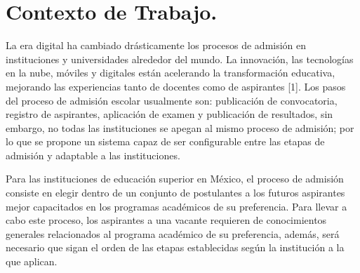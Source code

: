 \section{Contexto de Trabajo.}
    La era digital ha cambiado drásticamente los procesos de admisión en instituciones y universidades alrededor del mundo. La innovación, las  tecnologías en la nube, móviles y digitales están acelerando la transformación educativa, mejorando las experiencias tanto de docentes como de aspirantes [1]. Los pasos del proceso de admisión escolar usualmente son: publicación de convocatoria, registro de aspirantes, aplicación de examen y publicación de resultados, sin embargo, no todas las instituciones se apegan al mismo proceso de admisión; por lo que se propone un sistema capaz de ser configurable entre las etapas de admisión y adaptable a las instituciones.
    
    Para las instituciones de educación superior en México, el proceso de admisión consiste en elegir dentro de un conjunto de postulantes a los futuros aspirantes mejor capacitados en los programas académicos de su preferencia. Para llevar a cabo este proceso, los aspirantes a una vacante requieren de conocimientos generales relacionados al programa académico de su preferencia, además, será necesario que sigan el orden de las etapas establecidas según la institución a la que aplican.
